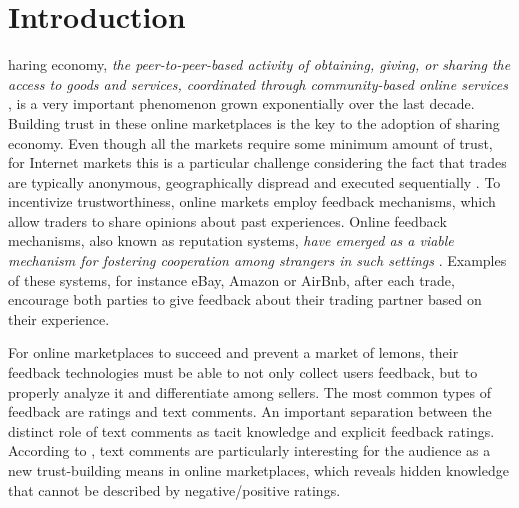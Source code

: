 %
%
\let\textcircled=\pgftextcircled
\chapter{Introduction}
\label{chap:intro}

haring economy, \textit{the peer-to-peer-based activity of obtaining, giving, or sharing the access  to  goods  and  services,  coordinated  through community-based online services} \cite{hamari2015sharing}, is a very important phenomenon grown exponentially over the last decade. Building trust in these online marketplaces is the key to the adoption of sharing economy. Even though all the markets require some minimum amount of trust, for Internet markets this is a particular challenge considering the fact that trades are typically anonymous, geographically dispread and executed sequentially \cite{owen2014trust}. To incentivize trustworthiness, online markets employ feedback mechanisms, which allow traders to share opinions about past experiences. Online feedback mechanisms, also known as reputation systems, \textit{have emerged as a viable mechanism for fostering cooperation among strangers in such settings} \cite{dellarocas2003digitization}. Examples of these systems, for instance eBay, Amazon or AirBnb, after each trade, encourage both parties to give feedback about their trading partner based on their experience. 

For online marketplaces to succeed and prevent a market of lemons, their feedback technologies must be able to not only collect users feedback, but to properly analyze it and differentiate among sellers. The most common types of feedback are ratings and text comments.  An important separation between the distinct role of text comments as tacit knowledge and explicit feedback ratings. According to \cite{pavlou2006nature}, text comments are particularly interesting for the audience as a new trust-building means in online marketplaces, which reveals hidden knowledge that cannot be described by negative/positive ratings. 

